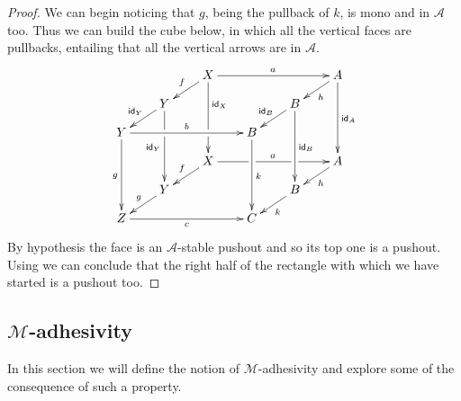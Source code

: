 \documentclass[a4paper]{article}
\newcommand{\id}[1]{\mathsf{id}_{#1}}
\def\Y{\textbf {\textup{Y}}}
\theoremstyle{definition}
\begin{document}
\begin{proof} We can begin noticing that $g$, being the pullback of $k$, is mono and in $\mathcal{A}$ too. Thus we can build the cube below, in which all the vertical faces are pullbacks, entailing that all the vertical arrows are in $\mathcal{A}$.
	\[\xymatrix@C=20pt@R=10pt{ & &X\ar[dl]_{f} \ar[ddd]^(.333333){\id{X}}|(.666666)\hole\ar[rrr]^{a} &&&A \ar[ddd]^{\id{A}} \ar[dl]^{h}\\& Y\ar[dl]_{\id{Y}} \ar[ddd]|(.333333)\hole_{\id{Y}} &&&B \ar[ddd]^{\id{B}} \ar[dl]_{\id{B}} \\Y \ar[ddd]_{g} \ar[rrr]^{b}&&& B\ar[ddd]^{k}\\&&X \ar[rrr]|(.34)\hole^{a}|(.67)\hole \ar[dl]_{f}&&& A \ar[dl]^{h}\\ & Y  \ar[dl]_{g}&&& B \ar[dl]^{k}\\ Z\ar[rrr]_{c} &&& C}\]
	By hypothesis the face is an $\mathcal{A}$-stable pushout and so its top one is a pushout. Using  we can conclude that the right half of the rectangle with which we have started is a pushout too. \qedhere 
\end{proof}

\subsection{$\mathcal{M}$-adhesivity}

In this section we will define the notion of $\mathcal{M}$-adhesivity \cite{azzi2019essence,ehrig2012,ehrig2014adhesive,heindel2009category,lack2005adhesive} and explore some of the consequence of such a property. 
\end{document}
